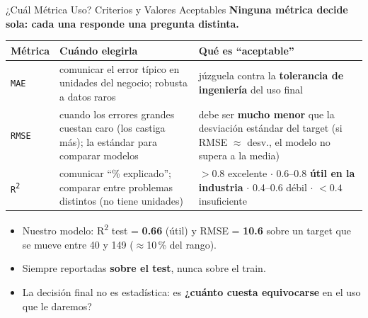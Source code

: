 \documentclass[aspectratio=169, 11pt]{beamer}
\begin{document}
\begin{frame}[shrink=15]{¿Cuál Métrica Uso? Criterios y Valores Aceptables}
  \vspace{-6pt}
  {\small\color{arcaDark}\bfseries
    Ninguna métrica decide sola: cada una responde una pregunta distinta.}

  \vspace{5pt}
  \centering
  {\scriptsize
  \renewcommand{\arraystretch}{1.45}
  \begin{tabular}{@{}l p{4.4cm} p{4.8cm}@{}}
    \toprule
    {\bfseries\color{arcaRed} Métrica} & {\bfseries\color{arcaDark} Cuándo elegirla}
      & {\bfseries\color{arcaDark} Qué es ``aceptable''} \\
    \midrule
    \texttt{MAE} & comunicar el error típico en unidades
      del negocio; robusta a datos raros
      & júzguela contra la \textbf{tolerancia de ingeniería} del uso final \\
    \texttt{RMSE} & cuando los errores grandes cuestan caro
      (los castiga más); la estándar para comparar modelos
      & debe ser \textbf{mucho menor} que la desviación estándar del target
        (si RMSE \(\approx\) desv., el modelo no supera a la media) \\
    \texttt{R\textsuperscript{2}} & comunicar ``\% explicado'';
      comparar entre problemas distintos (no tiene unidades)
      & \(>0.8\) excelente \(\cdot\) 0.6--0.8 \textbf{útil en la industria}
        \(\cdot\) 0.4--0.6 débil \(\cdot\) \(<0.4\) insuficiente \\
    \bottomrule
  \end{tabular}
  }

  \vspace{7pt}
  {\scriptsize\color{textMuted}
  \begin{itemize}\setlength{\itemsep}{3pt}
    \item[{\color{codeGreen}\scriptsize\faCheck}]
      Nuestro modelo: R\textsuperscript{2} test = \textbf{0.66} (útil) y RMSE = \textbf{10.6}
      sobre un target que se mueve entre 40 y 149 (\(\approx\)10\,\% del rango).
    \item[{\color{arcaRed}\scriptsize\faExclamationTriangle}]
      Siempre reportadas \textbf{sobre el test}, nunca sobre el train.
    \item[{\color{arcaRed}\scriptsize\faArrowRight}]
      La decisión final no es estadística: es \textbf{¿cuánto cuesta equivocarse}
      en el uso que le daremos?
  \end{itemize}
  }
\end{frame}
\end{document}

